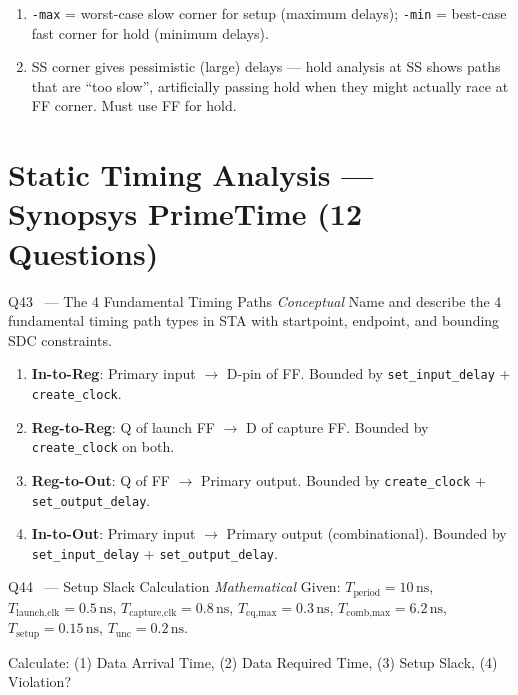 \documentclass[12pt,a4paper]{article}
\newcommand{\advanced}{%
  \fbox{\textcolor{advred}{\bfseries\sffamily\small ADVANCED}}}
\newcommand{\moderate}{%
  \fbox{\textcolor{modoran}{\bfseries\sffamily\small MODERATE}}}
\begin{document}
\begin{answerbox}
\begin{enumerate}[label=\textbf{\alph*)}]
  \item \texttt{-max} = worst-case slow corner for setup (maximum delays); \texttt{-min} = best-case fast corner for hold (minimum delays).
  \item SS corner gives pessimistic (large) delays --- hold analysis at SS shows paths that are ``too slow'', artificially passing hold when they might actually race at FF corner. Must use FF for hold.
\end{enumerate}
\end{answerbox}

\section{Static Timing Analysis --- Synopsys PrimeTime (12 Questions)}
\label{sec:sta}

\begin{questionbox}{Q43 \moderate\ --- The 4 Fundamental Timing Paths \hfill\textit{Conceptual}}
Name and describe the 4 fundamental timing path types in STA with startpoint, endpoint, and bounding SDC constraints.
\end{questionbox}

\begin{answerbox}
\begin{enumerate}
  \item \textbf{In-to-Reg}: Primary input $\to$ D-pin of FF. Bounded by \texttt{set\_input\_delay} + \texttt{create\_clock}.
  \item \textbf{Reg-to-Reg}: Q of launch FF $\to$ D of capture FF. Bounded by \texttt{create\_clock} on both.
  \item \textbf{Reg-to-Out}: Q of FF $\to$ Primary output. Bounded by \texttt{create\_clock} + \texttt{set\_output\_delay}.
  \item \textbf{In-to-Out}: Primary input $\to$ Primary output (combinational). Bounded by \texttt{set\_input\_delay} + \texttt{set\_output\_delay}.
\end{enumerate}
\end{answerbox}

\begin{questionbox}{Q44 \advanced\ --- Setup Slack Calculation \hfill\textit{Mathematical}}
Given: $T_{\text{period}}=10\,\text{ns}$, $T_{\text{launch,clk}}=0.5\,\text{ns}$, $T_{\text{capture,clk}}=0.8\,\text{ns}$, $T_{\text{cq,max}}=0.3\,\text{ns}$, $T_{\text{comb,max}}=6.2\,\text{ns}$, $T_{\text{setup}}=0.15\,\text{ns}$, $T_{\text{unc}}=0.2\,\text{ns}$.

Calculate: (1) Data Arrival Time, (2) Data Required Time, (3) Setup Slack, (4) Violation?
\end{questionbox}
\end{document}
